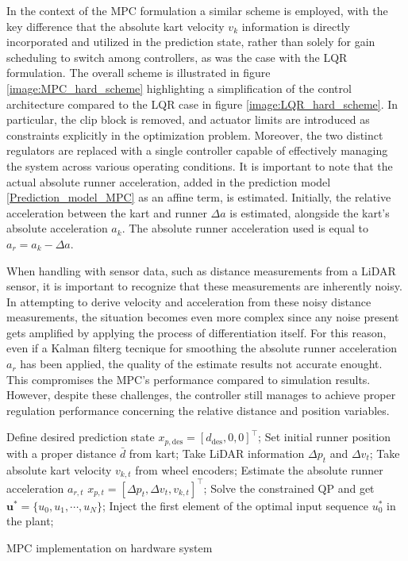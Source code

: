 \documentclass[a4paper,12pt,oneside]{book}
\begin{document}
In the context of the MPC formulation a similar scheme is employed, with the key difference that the absolute kart velocity $v_k$ information is directly incorporated and utilized in the prediction state, rather than solely for gain scheduling to switch among controllers, as was the case with the LQR formulation.
The overall scheme is illustrated in figure \ref{image:MPC_hard_scheme} highlighting a simplification of the control architecture compared to the LQR case in figure \ref{image:LQR_hard_scheme}.
In particular, the clip block is removed, and actuator limits are introduced as constraints explicitly in the optimization problem.
Moreover, the two distinct regulators are replaced with a single controller capable of effectively managing the system across various operating conditions.
It is important to note that the actual absolute runner acceleration, added in the prediction model  \eqref{Prediction_model_MPC} as an affine term, is estimated. 
 Initially, the relative acceleration between the kart and runner $\Delta a$ is estimated, alongside the kart's absolute acceleration $a_k$.
The absolute runner acceleration used is equal to $a_r = a_k - \Delta a$.

\bigskip
When handling with sensor data, such as distance measurements from a LiDAR sensor, it is important to recognize that these measurements are inherently noisy.
In attempting to derive velocity and acceleration from these noisy distance measurements, the situation becomes even more complex since any noise present gets amplified by applying the process of differentiation itself.
For this reason, even if a Kalman filterg tecnique for smoothing the absolute runner acceleration $a_r$ has been applied, the quality of the estimate results not accurate enought.
This compromises the MPC's performance compared to simulation results. 
However, despite these challenges, the controller still manages to achieve proper regulation performance concerning the relative distance and position variables.

\begin{algorithm}
\begin{algorithmic}[1]
	\State Define desired prediction state $x_{p,\text{des}} = [d_{\text{des}}, 0, 0]^\top$;
	\State Set initial runner position with a proper distance $\bar{d}$ from kart;
		\State Take LiDAR information $\Delta p_t$ and $\Delta v_t$;
		\State Take absolute kart velocity $v_{k,t}$ from wheel encoders;
 		\State Estimate the absolute runner acceleration $a_{r,t}$
		\State $x_{p,t} = [\Delta p_t, \Delta v_t, v_{k,t}]^\top$;
		\State Solve the constrained QP and get $\boldsymbol{u}^* = \{u_0, u_1, \cdots, u_N\}$; 
		\State Inject the first element of the optimal input sequence $u_0^*$ in the plant;
	\EndFor
\caption{MPC implementation on hardware system}
\label{alg:MPC_hard_implementation}
\end{algorithmic}
\end{algorithm}
\end{document}
